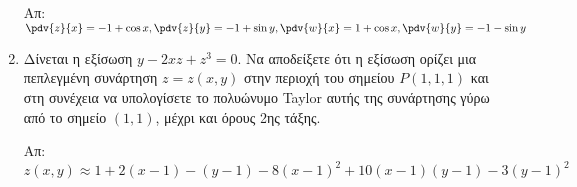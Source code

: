 \begin{enumerate}
		\hfill Απ: $ \pdv{z}{x} = -1 + \cos{x}, \pdv{z}{y} = -1 + \sin{y}, \pdv{w}{x} = 1 +
		\cos{x}, \pdv{w}{y} = -1 - \sin{y}  $ 

	\item Δίνεται η εξίσωση $ y - 2xz + z^{3} = 0 $. Να αποδείξετε ότι η εξίσωση ορίζει μια
		πεπλεγμένη συνάρτηση $ z = z(x,y) $ στην περιοχή του σημείου $ P(1,1,1) $ και στη συνέχεια
		να υπολογίσετε το πολυώνυμο \textlatin{Taylor} αυτής της συνάρτησης γύρω από το σημείο $
		(1,1) $, μέχρι και όρους 2ης τάξης. 

		\hfill Απ: $ z(x,y)\approx 1 + 2(x-1) - (y-1) - 8(x-1)^{2} + 10(x-1)(y-1) - 3(y-1)^{2} $ 
\end{enumerate}



